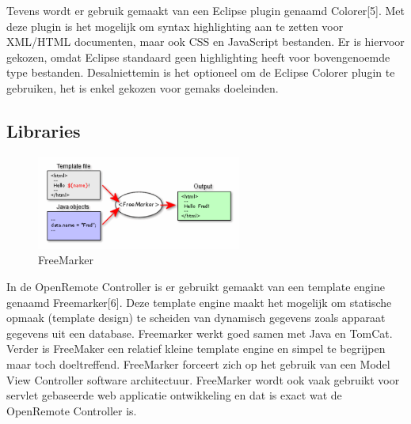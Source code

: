 \documentclass[]{article}
\begin{document}
Tevens wordt er gebruik gemaakt van een Eclipse plugin genaamd Colorer[5].
Met deze plugin is het mogelijk om syntax highlighting aan te zetten voor
XML/HTML documenten, maar ook CSS en JavaScript bestanden. Er is hiervoor
gekozen, omdat Eclipse standaard geen highlighting heeft voor bovengenoemde
type bestanden. Desalniettemin is het optioneel om de Eclipse Colorer
plugin te gebruiken, het is enkel gekozen voor gemaks doeleinden.

\subsection{Libraries}
\begin{figure}[htpb]
   \begin{center}
     \includegraphics[width=0.6\textwidth]{freemarker.pdf}
   \end{center}
   \caption{FreeMarker}
\end{figure}

In de OpenRemote Controller is er gebruikt gemaakt van een template engine
genaamd Freemarker[6]. Deze template engine maakt het mogelijk om statische
opmaak (template design) te scheiden van dynamisch gegevens zoals apparaat
gegevens uit een database. Freemarker werkt goed samen met Java en TomCat.
Verder is FreeMaker een relatief kleine template engine en simpel te
begrijpen maar toch doeltreffend. FreeMarker forceert zich op het gebruik
van een Model View Controller software architectuur. FreeMarker wordt ook
vaak gebruikt voor servlet gebaseerde web applicatie ontwikkeling en dat is
exact wat de OpenRemote Controller is.
\end{document}
